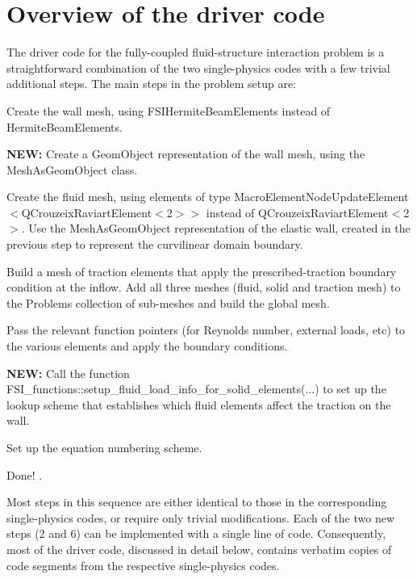 \hypertarget{index_driver_code}{}\section{Overview of the driver code}\label{index_driver_code}
The driver code for the fully-\/coupled fluid-\/structure interaction problem is a straightforward combination of the two single-\/physics codes with a few trivial additional steps. The main steps in the problem setup are\+:
\begin{DoxyEnumerate}
\item Create the wall mesh, using {\ttfamily F\+S\+I\+Hermite\+Beam\+Elements} instead of {\ttfamily Hermite\+Beam\+Elements}.
\item {\bfseries N\+EW\+:} Create a {\ttfamily Geom\+Object} representation of the wall mesh, using the {\ttfamily Mesh\+As\+Geom\+Object} class.
\item Create the fluid mesh, using elements of type {\ttfamily Macro\+Element\+Node\+Update\+Element$<$Q\+Crouzeix\+Raviart\+Element$<$2$>$$>$} instead of {\ttfamily Q\+Crouzeix\+Raviart\+Element$<$2$>$}. Use the {\ttfamily Mesh\+As\+Geom\+Object} representation of the elastic wall, created in the previous step to represent the curvilinear domain boundary.
\item Build a mesh of traction elements that apply the prescribed-\/traction boundary condition at the inflow. Add all three meshes (fluid, solid and traction mesh) to the {\ttfamily Problem\textquotesingle{}s} collection of sub-\/meshes and build the global mesh.
\item Pass the relevant function pointers (for Reynolds number, external loads, etc) to the various elements and apply the boundary conditions.
\item {\bfseries N\+EW\+:} Call the function {\ttfamily F\+S\+I\+\_\+functions\+::setup\+\_\+fluid\+\_\+load\+\_\+info\+\_\+for\+\_\+solid\+\_\+elements}(...) to set up the lookup scheme that establishes which fluid elements affect the traction on the wall.
\item Set up the equation numbering scheme.
\item Done! .
\end{DoxyEnumerate}

Most steps in this sequence are either identical to those in the corresponding single-\/physics codes, or require only trivial modifications. Each of the two new steps (2 and 6) can be implemented with a single line of code. Consequently, most of the driver code, discussed in detail below, contains verbatim copies of code segments from the respective single-\/physics codes.



